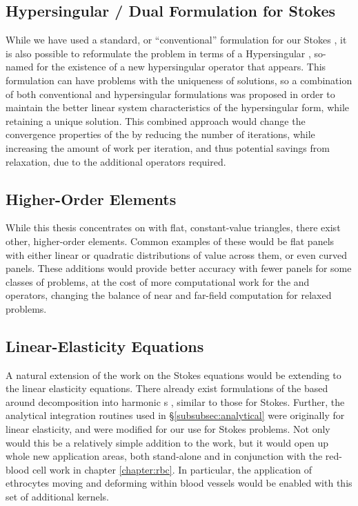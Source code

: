 \subsection{Hypersingular / Dual Formulation for Stokes}

While we have used a standard, or ``conventional'' formulation for our Stokes {\bem}, it is also possible to reformulate the problem in terms of a Hypersingular {\bem}, so-named for the existence of a new hypersingular operator that appears. This formulation can have problems with the uniqueness of solutions, so  a combination of both conventional and hypersingular formulations was proposed \cite{Liu2009} in order to maintain the better linear system characteristics of the hypersingular form, while retaining a unique solution. This combined approach would change the convergence properties of the {\bem} by reducing the number of iterations, while increasing the amount of work per iteration, and thus potential savings from relaxation, due to the additional operators required. 

\subsection{Higher-Order Elements}

While this thesis concentrates on {\bem} with flat, constant-value triangles, there exist other, higher-order elements. Common examples of these would be flat panels with either linear or quadratic distributions of value across them, or even curved panels. These additions would provide better accuracy with fewer panels for some classes of problems, at the cost of more computational work for the {\ptop} and {\ptom} operators, changing the balance of near and far-field computation for relaxed problems.

\subsection{Linear-Elasticity Equations}

A natural extension of the work on the Stokes equations would be extending to the linear elasticity equations. There already exist formulations of the {\fmm} based around decomposition into harmonic {\fmm}s \cite{fuEtal98}, similar to those for Stokes. Further, the analytical integration routines used in \S\ref{subsubsec:analytical} were originally for linear elasticity, and were modified for our use for Stokes problems. Not only would this be a relatively simple addition to the work, but it would open up whole new application areas, both stand-alone and in conjunction with the red-blood cell work in chapter \ref{chapter:rbc}. In particular, the application of ethrocytes moving and deforming within blood vessels would be enabled with this set of additional {\fmm} kernels.

